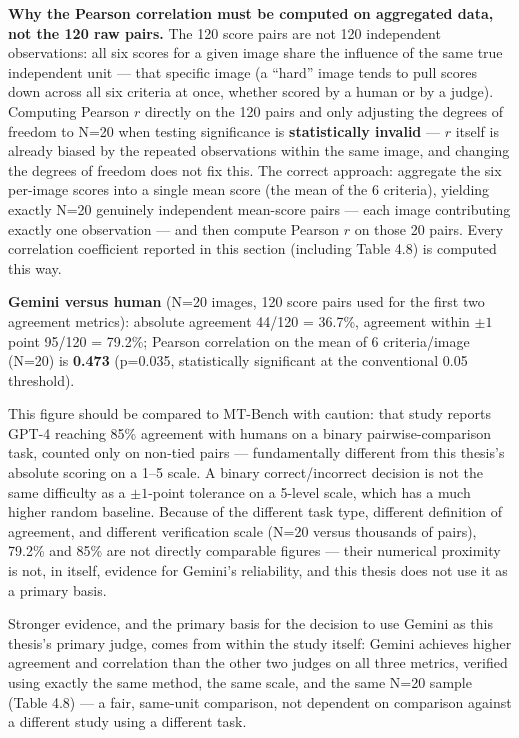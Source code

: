 \documentclass[12pt,a4paper]{report}
\begin{document}
\textbf{Why the Pearson correlation must be computed on aggregated data, not the 120 raw pairs.} The 120 score pairs are not 120 independent observations: all six scores for a given image share the influence of the same true independent unit --- that specific image (a ``hard'' image tends to pull scores down across all six criteria at once, whether scored by a human or by a judge). Computing Pearson $r$ directly on the 120 pairs and only adjusting the degrees of freedom to N=20 when testing significance is \textbf{statistically invalid} --- $r$ itself is already biased by the repeated observations within the same image, and changing the degrees of freedom does not fix this. The correct approach: aggregate the six per-image scores into a single mean score (the mean of the 6 criteria), yielding exactly N=20 genuinely independent mean-score pairs --- each image contributing exactly one observation --- and then compute Pearson $r$ on those 20 pairs. Every correlation coefficient reported in this section (including Table 4.8) is computed this way.

\textbf{Gemini versus human} (N=20 images, 120 score pairs used for the first two agreement metrics): absolute agreement 44/120 = 36.7\%, agreement within $\pm 1$ point 95/120 = 79.2\%; Pearson correlation on the mean of 6 criteria/image (N=20) is \textbf{0.473} (p=0.035, statistically significant at the conventional 0.05 threshold).

This figure should be compared to MT-Bench with caution: that study reports GPT-4 reaching 85\% agreement with humans on a binary pairwise-comparison task, counted only on non-tied pairs \cite{zheng2023mtbench} --- fundamentally different from this thesis's absolute scoring on a 1--5 scale. A binary correct/incorrect decision is not the same difficulty as a $\pm 1$-point tolerance on a 5-level scale, which has a much higher random baseline. Because of the different task type, different definition of agreement, and different verification scale (N=20 versus thousands of pairs), 79.2\% and 85\% are not directly comparable figures --- their numerical proximity is not, in itself, evidence for Gemini's reliability, and this thesis does not use it as a primary basis.

Stronger evidence, and the primary basis for the decision to use Gemini as this thesis's primary judge, comes from within the study itself: Gemini achieves higher agreement and correlation than the other two judges on all three metrics, verified using exactly the same method, the same scale, and the same N=20 sample (Table 4.8) --- a fair, same-unit comparison, not dependent on comparison against a different study using a different task.
\end{document}
